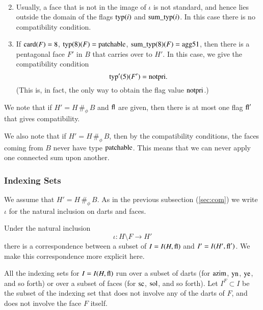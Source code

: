 \begin{definition}
\begin{enumerate}
$$\begin{array}{lll}
        \end{array}
        $$
    \item Usually, a face that is not in the image of $\iota$ is
    not standard, and hence lies outside the domain of the flags
    ${\operatorname{typ}}(i)$ and ${\operatorname{sum\_typ}}(i)$.  In this case there is
    no compatibility condition.
    \item If ${\operatorname{card}}(F)=8$, ${\operatorname{typ}}(8)(F)={\operatorname{patchable}}$,
    ${\operatorname{sum\_typ}}(8)(F) = {\operatorname{agg51}}$, then there is a
    pentagonal face $F'$ in $B$ that carries over to $H'$.  In this case, we
    give the compatibility condition
        $${\operatorname{typ}}'(5)(F') = {\operatorname{notpri}}.$$
    (This is, in fact, the only way to obtain the flag value
    ${\operatorname{notpri}}$.)
    \end{enumerate}
\end{definition}


\begin{remark}
We note that if $H'= H\,\#_\phi\, B$ and ${\operatorname{fl}}$ are given,
then there is at most one flag ${\operatorname{fl}}'$ that gives
compatibility.
\end{remark}

\begin{remark}
We also note that if $H' = H\,\#_\phi\, B$, then by the
compatibility conditions, the faces coming from $B$ never have
type ${\operatorname{patchable}}$. This means that we can never apply one
connected sum upon another.
\end{remark}

\subsubsection{Indexing Sets}

We assume that $H' = H\,\#_\phi\, B$.  As in the previous
subsection (\ref{sec:com}) we write $\iota$ for the natural
inclusion  on darts and faces.

Under the natural inclusion
    $$\iota:H\setminus F \to H'$$
there is a correspondence between a subset of $I=I(H,{\operatorname{fl}})$ and
$I'=I(H',{\operatorname{fl}}')$.  We make this correspondence more explicit
here.



All the indexing sets for $I=I(H,{\operatorname{fl}})$ run over a subset of
darts (for ${\operatorname{azim}}$, ${\operatorname{yn}}$, ${\operatorname{ye}}$, and so forth) or
over a subset of faces (for ${\operatorname{sc}}$, ${\operatorname{sol}}$, and so forth).
Let $I^F\subset I$ be the subset of the indexing set that does not
involve any of the darts of $F$, and does not involve the face $F$
itself.

